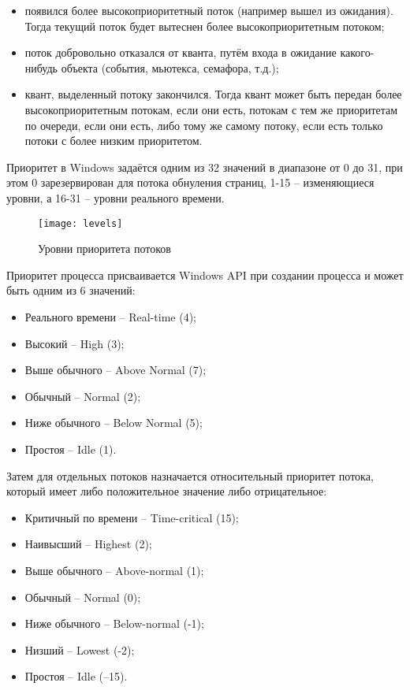 \begin{itemize}
	\item появился более высокоприоритетный поток (например вышел из ожидания). Тогда текущий поток будет вытеснен более высокоприоритетным потоком;
	\item поток добровольно отказался от кванта, путём входа в ожидание какого-нибудь объекта (события, мьютекса, семафора, т.д.);
	\item квант, выделенный потоку закончился. Тогда квант может быть передан более высокоприоритетным потокам, если они есть, потокам с тем же приоритетам по очереди, если они есть, либо тому же самому потоку, если есть только потоки с более низким приоритетом.
\end{itemize}

Приоритет в Windows задаётся одним из 32 значений в диапазоне от 0 до 31, при этом 0 зарезервирован для потока обнуления страниц, 1-15 -- изменяющиеся уровни, а 16-31 -- уровни реального времени. 

\begin{figure}[H]
	\centering
	\texttt{[image: levels]}
	\caption{Уровни приоритета потоков}
	\label{fig:levels}
\end{figure}

Приоритет процесса присваивается Windows API при создании процесса и может быть одним из 6 значений:
\begin{itemize}
	\item Реального времени -- Real-time (4); 
	\item Высокий -- High (3);
	\item Выше обычного -- Above Normal (7);
	\item Обычный -- Normal (2);
	\item Ниже обычного -- Below Normal (5);
	\item Простоя -- Idle (1).
\end{itemize}

Затем для отдельных потоков назначается относительный приоритет потока, который имеет либо положительное значение либо отрицательное:

\begin{itemize}
	\item Критичный по времени -- Time-critical (15);
	\item Наивысший -- Highest (2);
	\item Выше обычного -- Above-normal (1);
	\item Обычный -- Normal (0);
	\item Ниже обычного -- Below-normal (-1);
	\item Низший -- Lowest (-2);
	\item Простоя -- Idle (–15).
\end{itemize}

